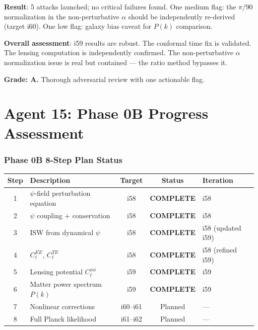 \documentclass[11pt,a4paper]{article}
\begin{document}
\begin{tcolorbox}[colback=green!5!white, colframe=green!60!black, title={Agent 14: Adversarial Attack --- NO CRITICAL FLAGS}]
\textbf{Result}: 5 attacks launched; no critical failures found. One medium flag: the $\pi/90$ normalization in the non-perturbative $\alpha$ should be independently re-derived (target i60). One low flag: galaxy bias caveat for $P(k)$ comparison.

\textbf{Overall assessment}: i59 results are robust. The conformal time fix is validated. The lensing computation is independently confirmed. The non-perturbative $\alpha$ normalization issue is real but contained --- the ratio method bypasses it.

\textbf{Grade: A.} Thorough adversarial review with one actionable flag.
\end{tcolorbox}


\part{Agent 15: Phase 0B Progress Assessment}
\label{part:progress}

\section{Phase 0B 8-Step Plan Status}

\begin{center}
\begin{longtable}{clccl}
\toprule
\textbf{Step} & \textbf{Description} & \textbf{Target} & \textbf{Status} & \textbf{Iteration} \\
\midrule
1 & $\psi$-field perturbation equation & i58 & \textbf{COMPLETE} & i58 \\
2 & $\psi$ coupling + conservation & i58 & \textbf{COMPLETE} & i58 \\
3 & ISW from dynamical $\psi$ & i58 & \textbf{COMPLETE} & i58 (updated i59) \\
4 & $C_\ell^{EE}$, $C_\ell^{TE}$ & i58 & \textbf{COMPLETE} & i58 (refined i59) \\
5 & Lensing potential $C_\ell^{\phi\phi}$ & i59 & \textbf{COMPLETE} & i59 \\
6 & Matter power spectrum $P(k)$ & i59 & \textbf{COMPLETE} & i59 \\
7 & Nonlinear corrections & i60--i61 & Planned & --- \\
8 & Full Planck likelihood & i61--i62 & Planned & --- \\
\bottomrule
\end{longtable}
\end{center}
\end{document}
